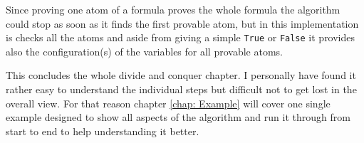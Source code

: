Since proving one atom of a formula proves the whole formula the algorithm could stop as soon as it finds the first provable atom, but in this implementation is checks all the atoms and aside from giving a simple \texttt{True} or \texttt{False} it provides also the configuration(s) of the variables for all provable atoms.



\bigskip
\par This concludes the whole divide and conquer chapter. I personally have found it rather easy to understand the individual steps but difficult not to get lost in the overall view. For that reason chapter \ref{chap: Example} will cover one single example designed to show all aspects of the algorithm and run it through from start to end to help understanding it better.

